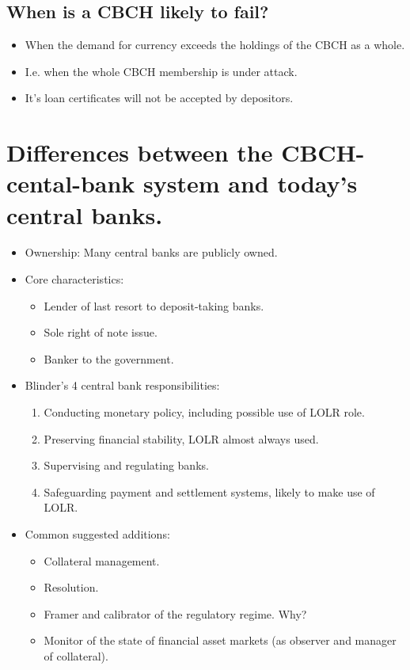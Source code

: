 \documentclass[20pt]{article}
\begin{document}
\begin{screen}
\newpage
\end{screen}
\subsection{When is a CBCH likely to fail?}
\begin{itemize}
    \item When the demand for currency exceeds the holdings of the CBCH as a whole.
    \item I.e. when the whole CBCH membership is under attack.
    \item It's loan certificates will not be accepted by depositors.
\end{itemize}

\section{Differences between the CBCH-cental-bank system and today's central banks.}
\begin{itemize}
    \item Ownership: Many central banks are publicly owned.
    \item Core characteristics:
    \begin{itemize}
        \item Lender of last resort to deposit-taking banks.
        \item Sole right of note issue.
        \item Banker to the government.
    \end{itemize}
    \item Blinder's 4 central bank responsibilities:
        \begin{enumerate}
            \item Conducting monetary policy, including possible use of LOLR role.
            \item Preserving financial stability, LOLR almost always used.
            \item Supervising and regulating banks.
            \item Safeguarding payment and settlement systems, likely to make use of LOLR.
        \end{enumerate}
        \item Common suggested additions:
        \begin{itemize}
            \item Collateral management.
            \item Resolution.
            \item Framer and calibrator of the regulatory regime.  Why?  %
            \item Monitor of the state of financial asset markets (as observer and manager of collateral).
        \end{itemize}
    \end{itemize}
\end{document}

